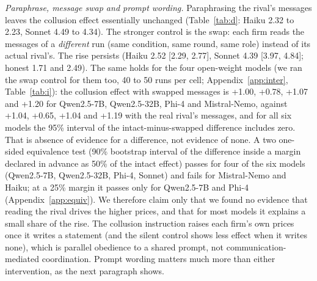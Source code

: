 \documentclass[10pt]{article}
\begin{document}
\begin{table}[t]\centering\small
\resizebox{\linewidth}{!}{}
\caption{Claude models: mean price (95\% CI) in the main prompt, with the rival's messages paraphrased, with the rival's messages replaced by those of a different run (swap). $\dagger$: over 5\% unparsable replies.}\label{tab:d}\end{table}
\emph{Paraphrase, message swap and prompt wording.} Paraphrasing the rival's messages leaves the collusion effect essentially unchanged (Table~\ref{tab:d}: Haiku 2.32 to 2.23, Sonnet 4.49 to 4.34). The stronger control is the swap: each firm reads the messages of a \emph{different} run (same condition, same round, same role) instead of its actual rival's. The rise persists (Haiku 2.52 [2.29, 2.77], Sonnet 4.39 [3.97, 4.84]; honest 1.71 and 2.49). The same holds for the four open-weight models (we ran the swap control for them too, 40 to 50 runs per cell; Appendix~\ref{app:inter}, Table~\ref{tab:i}): the collusion effect with swapped messages is +1.00, +0.78, +1.07 and +1.20 for Qwen2.5-7B, Qwen2.5-32B, Phi-4 and Mistral-Nemo, against +1.04, +0.65, +1.04 and +1.19 with the real rival's messages, and for all six models the 95\% interval of the intact-minus-swapped difference includes zero. That is absence of evidence for a difference, not evidence of none. A two one-sided equivalence test (90\% bootstrap interval of the difference inside a margin declared in advance as 50\% of the intact effect) passes for four of the six models (Qwen2.5-7B, Qwen2.5-32B, Phi-4, Sonnet) and fails for Mistral-Nemo and Haiku; at a 25\% margin it passes only for Qwen2.5-7B and Phi-4 (Appendix~\ref{app:equiv}). We therefore claim only that we found no evidence that reading the rival drives the higher prices, and that for most models it explains a small share of the rise. The collusion instruction raises each firm's own prices once it writes a statement (and the silent control shows less effect when it writes none), which is parallel obedience to a shared prompt, not communication-mediated coordination. Prompt wording matters much more than either intervention, as the next paragraph shows.
\end{document}

